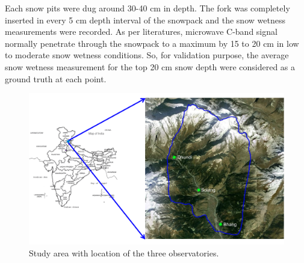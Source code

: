 Each snow pits were dug around 30-40 cm in depth. The fork was completely inserted in every 5 cm depth interval of the snowpack and the snow wetness measurements were recorded. As per literatures, microwave C-band signal normally penetrate through the snowpack to a maximum by 15 to 20 cm in low to moderate snow wetness conditions. So, for validation purpose, the average snow wetness measurement for the top 20 cm snow depth were considered as a ground truth at each point.
\begin{figure}[!h]
	\centering
	\includegraphics[width=\columnwidth]{Figures/sa_final}
	\caption{Study area with location of the three observatories.}
	\label{fig:study_area}
\end{figure}


